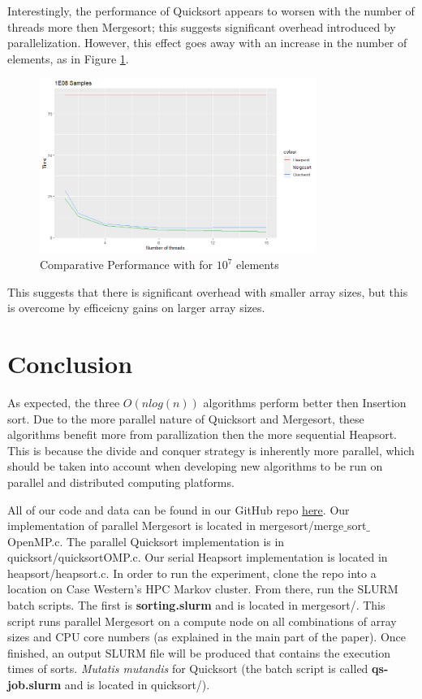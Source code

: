\documentclass[conference]{IEEEtran}
\begin{document}
    Interestingly, the performance of Quicksort appears to worsen with the number of threads more then Mergesort; this suggests significant overhead introduced by parallelization. 
    However, this effect goes away with an increase in the number of elements, as in Figure \ref{1e8}. 
    \begin{figure}
        \includegraphics[width=9cm]{1e8.png} 
        \caption{Comparative Performance with for $10^7$ elements}
        \label{1e8}
    \end{figure}
    
    This suggests that there is significant overhead with smaller array sizes, but this is overcome by efficeicny gains on larger array sizes. 
    \section{Conclusion}
    As expected, the three $O(n log(n))$ algorithms perform better then Insertion sort. 
    Due to the more parallel nature of Quicksort and Mergesort, these algorithms benefit more from parallization then the more sequential Heapsort. 
    This is because the divide and conquer strategy is inherently more parallel, which should be taken into account when developing new algorithms to be run on parallel and distributed computing platforms. 
    
    
    \appendix
	All of our code and data can be found in our GitHub repo \href{https://github.com/causeyc/csds438_sorting}{here}. Our implementation of parallel Mergesort is located in mergesort/merge$\_$sort$\_$OpenMP.c. The parallel Quicksort implementation is in quicksort/quicksortOMP.c. Our serial Heapsort implementation is located in heapsort/heapsort.c. In order to run the experiment, clone the repo into a location on Case Western's HPC Markov cluster. From there, run the SLURM batch scripts. The first is \textbf{sorting.slurm} and is located in mergesort/. This script runs parallel Mergesort on a compute node on all combinations of array sizes and CPU core numbers (as explained in the main part of the paper). Once finished, an output SLURM file will be produced that contains the execution times of sorts. \textit{Mutatis mutandis} for Quicksort (the batch script is called \textbf{qs-job.slurm} and is located in quicksort/).
\end{document}
